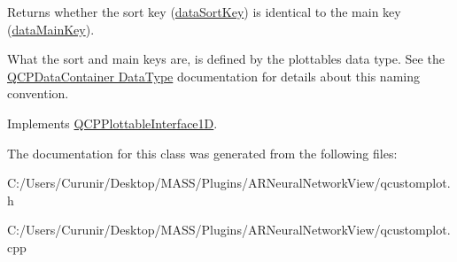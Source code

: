 Returns whether the sort key (\hyperlink{class_q_c_p_error_bars_a1ef91328ad7dde84695958139d5f40cf}{data\+Sort\+Key}) is identical to the main key (\hyperlink{class_q_c_p_error_bars_ae3931213f76cd34a824c42c22a1dca74}{data\+Main\+Key}).

What the sort and main keys are, is defined by the plottable\textquotesingle{}s data type. See the \hyperlink{class_q_c_p_data_container_qcpdatacontainer-datatype}{Q\+C\+P\+Data\+Container Data\+Type} documentation for details about this naming convention. 

Implements \hyperlink{class_q_c_p_plottable_interface1_d_a229e65e7ab968dd6cd0e259fa504b79d}{Q\+C\+P\+Plottable\+Interface1D}.



The documentation for this class was generated from the following files\+:\begin{DoxyCompactItemize}
\item 
C\+:/\+Users/\+Curunir/\+Desktop/\+M\+A\+S\+S/\+Plugins/\+A\+R\+Neural\+Network\+View/qcustomplot.\+h\item 
C\+:/\+Users/\+Curunir/\+Desktop/\+M\+A\+S\+S/\+Plugins/\+A\+R\+Neural\+Network\+View/qcustomplot.\+cpp\end{DoxyCompactItemize}
